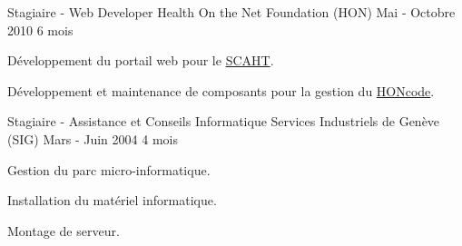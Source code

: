 
\begin{cventries}

  \cventry
    {Stagiaire - Web Developer}
    {Health On the Net Foundation (HON)}
    {Mai - Octobre 2010}
    {6 mois}
    {
      \begin{cvitems}
        \item{Développement du portail web pour le
          {\color{awesome-skyblue}\href{http://scaht.org/}{SCAHT}}.
        }
        \item{Développement et maintenance de composants pour la gestion du
          {\color{awesome-skyblue}\href{http://www.hon.ch/HONcode/Pro/Visitor/visitor.html}{HONcode}}.
        }
      \end{cvitems}
    }

  \cventry
    {Stagiaire - Assistance et Conseils Informatique}
    {Services Industriels de Genève (SIG)}
    {Mars - Juin 2004}
    {4 mois}
    {
      \begin{cvitems}
        \item{Gestion du parc micro-informatique.}
        \item{Installation du matériel informatique.}
        \item{Montage de serveur.}
      \end{cvitems}
    }

\end{cventries}
